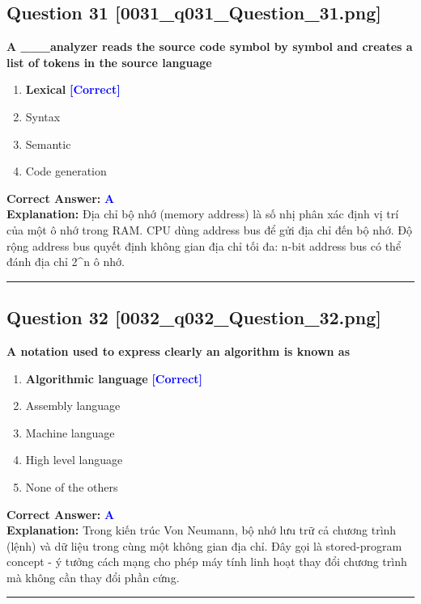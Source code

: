 \documentclass[11pt,a4paper]{article}
\begin{document}
\begin{minipage}{\textwidth}
\subsection*{Question 31 \quad \footnotesize{[0031\_q031\_Question\_31.png]}}
\noindent \textbf{A \_\_\_analyzer reads the source code symbol by symbol and creates a list of tokens in the source language}

\begin{enumerate}[label=\Alph*.]
    \item \textbf{Lexical} \hfill \textcolor{blue}{\textbf{[Correct]}}
    \item Syntax
    \item Semantic
    \item Code generation
\end{enumerate}

\noindent \textbf{Correct Answer:} \textcolor{blue}{\textbf{A}} \\[2pt]
\noindent \textbf{Explanation:} Địa chỉ bộ nhớ (memory address) là số nhị phân xác định vị trí của một ô nhớ trong RAM. CPU dùng address bus để gửi địa chỉ đến bộ nhớ. Độ rộng address bus quyết định không gian địa chỉ tối đa: n-bit address bus có thể đánh địa chỉ 2\textasciicircum{}n ô nhớ.

\par\vspace{0.3cm}
\hrule
\vspace{0.3cm}
\end{minipage}

\begin{minipage}{\textwidth}
\subsection*{Question 32 \quad \footnotesize{[0032\_q032\_Question\_32.png]}}
\noindent \textbf{A notation used to express clearly an algorithm is known as}

\begin{enumerate}[label=\Alph*.]
    \item \textbf{Algorithmic language} \hfill \textcolor{blue}{\textbf{[Correct]}}
    \item Assembly language
    \item Machine language
    \item High level language
    \item None of the others
\end{enumerate}

\noindent \textbf{Correct Answer:} \textcolor{blue}{\textbf{A}} \\[2pt]
\noindent \textbf{Explanation:} Trong kiến trúc Von Neumann, bộ nhớ lưu trữ cả chương trình (lệnh) và dữ liệu trong cùng một không gian địa chỉ. Đây gọi là stored-program concept - ý tưởng cách mạng cho phép máy tính linh hoạt thay đổi chương trình mà không cần thay đổi phần cứng.

\par\vspace{0.3cm}
\hrule
\vspace{0.3cm}
\end{minipage}
\end{document}
